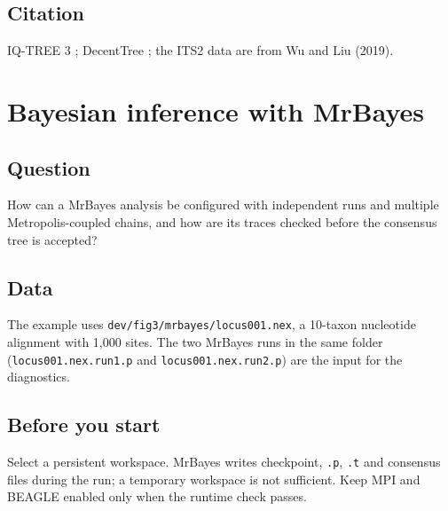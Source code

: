 \documentclass[11pt]{report}
\begin{document}
\section{Citation}
IQ-TREE 3 \cite{iqtree3}; DecentTree \cite{decenttree}; the ITS2 data are from
Wu and Liu (2019).

\chapter{Bayesian inference with MrBayes}
\section{Question}
How can a MrBayes analysis be configured with independent runs and multiple
Metropolis-coupled chains, and how are its traces checked before the
consensus tree is accepted?

\section{Data}
The example uses \texttt{dev/fig3/mrbayes/locus001.nex}, a 10-taxon nucleotide
alignment with 1,000 sites. The two MrBayes runs in the same folder
(\texttt{locus001.nex.run1.p} and \texttt{locus001.nex.run2.p}) are the input
for the diagnostics.

\section{Before you start}
Select a persistent workspace. MrBayes writes checkpoint, \texttt{.p},
\texttt{.t} and consensus files during the run; a temporary workspace is not
sufficient. Keep MPI and BEAGLE enabled only when the runtime check passes.
\end{document}
